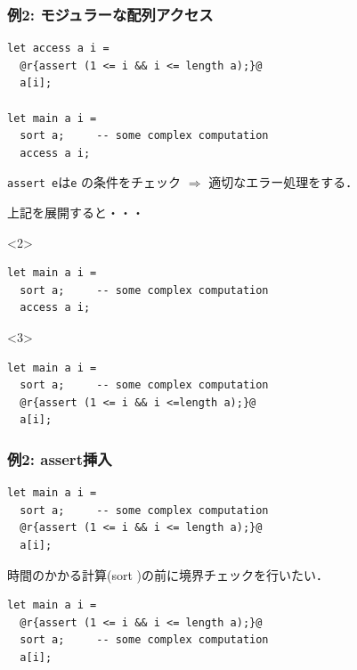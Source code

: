 \documentclass[dvipdfmx,cjk,xcolor=dvipsnames,envcountsect,notheorems,12pt,handout]{beamer} \usepackage{pgfpages} \pgfpagesuselayout{4 on 1}[a4paper,landscape,border shrink=5mm]
\theoremstyle{definition}
\begin{document}


\begin{frame}[fragile]
  \frametitle{例2: モジュラーな配列アクセス}
\begin{lstlisting}
let access a i =
  @r{assert (1 <= i && i <= length a);}@
  a[i];

let main a i =
  sort a;     -- some complex computation
  access a i;
\end{lstlisting}
  \lstinline|assert e|は\lstinline|e| の条件をチェック $\Rightarrow$ 適切なエラー処理をする． %

  \pause
  上記を展開すると・・・

  \begin{onlyenv}<2>
\begin{lstlisting}
let main a i =
  sort a;     -- some complex computation
  access a i;
\end{lstlisting}
  \end{onlyenv}

  \begin{onlyenv}<3>
\begin{lstlisting}
let main a i =
  sort a;     -- some complex computation
  @r{assert (1 <= i && i <=length a);}@
  a[i];
\end{lstlisting}
  \end{onlyenv}

\end{frame}

\begin{frame}[fragile]
  \frametitle{例2: assert挿入}
\begin{lstlisting}
let main a i =
  sort a;     -- some complex computation
  @r{assert (1 <= i && i <= length a);}@
  a[i];
\end{lstlisting}
  \pause
  時間のかかる計算(sort )の前に境界チェックを行いたい．
\begin{lstlisting}
let main a i =
  @r{assert (1 <= i && i <= length a);}@
  sort a;     -- some complex computation
  a[i];
\end{lstlisting}

\end{frame}
\end{document}
